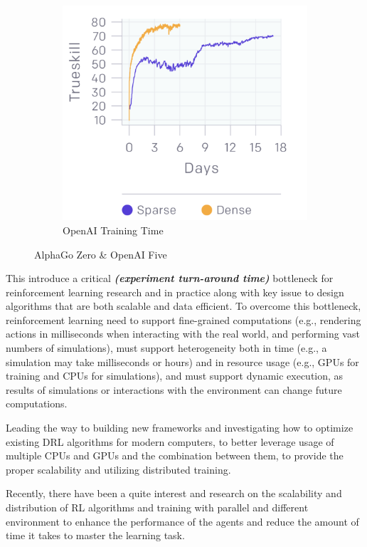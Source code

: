 \begin{figure}[!htb]
\begin{subfigure}[b]{0.3\textwidth}
		\includegraphics[width=\textwidth]{figures/rl/openai_five_time.png}
        \caption{OpenAI Training Time}
		\label{fig:openai_five_time}
	\end{subfigure}
	\hfill
	   \caption{AlphaGo Zero \& OpenAI Five}
	   \label{fig:zero_and_five}
\end{figure}

This introduce a critical \textit{\textbf{(experiment turn-around time)}} bottleneck for reinforcement learning research and in practice along with key issue to design algorithms that are both scalable and data efficient. To overcome this bottleneck, reinforcement learning need to support fine-grained computations (e.g., rendering actions in milliseconds when interacting with the real world, and performing vast numbers of simulations), must support heterogeneity both in time (e.g., a simulation may take milliseconds or hours) and in resource usage (e.g., GPUs for training and CPUs for simulations), and must support dynamic execution, as results of simulations or interactions with the environment can change future computations. 

Leading the way to building new frameworks and investigating how to optimize existing DRL algorithms for modern computers, to better leverage usage of multiple CPUs and GPUs and the combination between them, to provide the proper scalability and utilizing distributed training.

Recently, there have been a quite interest and research on the scalability and distribution of RL algorithms and training with parallel and different environment to enhance the performance of the agents and reduce the amount of time it takes to master the learning task.

